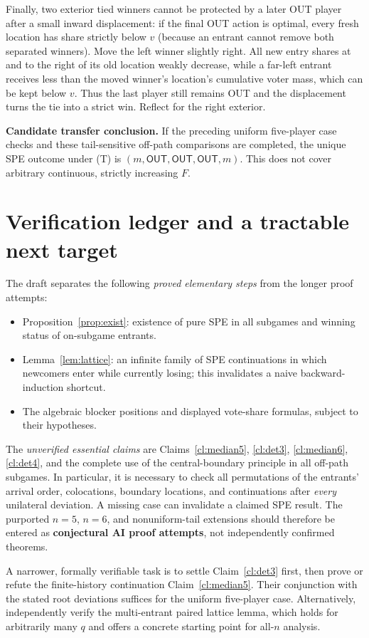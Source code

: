 \documentclass[10pt]{article}
\newcommand{\OUT}{\mathsf{OUT}}
\begin{document}
Finally, two exterior tied winners cannot be protected by a later OUT player after a small inward displacement: if the final OUT action is optimal, every fresh location has share strictly below $v$ (because an entrant cannot remove both separated winners). Move the left winner slightly right. All new entry shares at and to the right of its old location weakly decrease, while a far-left entrant receives less than the moved winner's location's cumulative voter mass, which can be kept below $v$. Thus the last player still remains OUT and the displacement turns the tie into a strict win. Reflect for the right exterior.

\textbf{Candidate transfer conclusion.} If the preceding uniform five-player case checks and these tail-sensitive off-path comparisons are completed, the unique SPE outcome under (T) is $(m,\OUT,\OUT,\OUT,m)$. This does not cover arbitrary continuous, strictly increasing $F$.

\section{Verification ledger and a tractable next target}
The draft separates the following \emph{proved elementary steps} from the longer proof attempts:
\begin{itemize}
\item Proposition~\ref{prop:exist}: existence of pure SPE in all subgames and winning status of on-subgame entrants.
\item Lemma~\ref{lem:lattice}: an infinite family of SPE continuations in which newcomers enter while currently losing; this invalidates a naive backward-induction shortcut.
\item The algebraic blocker positions and displayed vote-share formulas, subject to their hypotheses.
\end{itemize}
The \emph{unverified essential claims} are Claims~\ref{cl:median5}, \ref{cl:det3}, \ref{cl:median6}, \ref{cl:det4}, and the complete use of the central-boundary principle in all off-path subgames. In particular, it is necessary to check all permutations of the entrants' arrival order, colocations, boundary locations, and continuations after \emph{every} unilateral deviation. A missing case can invalidate a claimed SPE result. The purported $n=5$, $n=6$, and nonuniform-tail extensions should therefore be entered as \textbf{conjectural AI proof attempts}, not independently confirmed theorems.

A narrower, formally verifiable task is to settle Claim~\ref{cl:det3} first, then prove or refute the finite-history continuation Claim~\ref{cl:median5}. Their conjunction with the stated root deviations suffices for the uniform five-player case. Alternatively, independently verify the multi-entrant paired lattice lemma, which holds for arbitrarily many $q$ and offers a concrete starting point for all-$n$ analysis.
\end{document}

